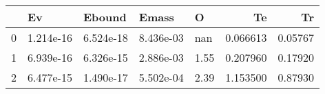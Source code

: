 \begin{tabular}{lllllrr}
\toprule
{} &         Ev &     Ebound &      Emass &     O &        Te &       Tr \\
\midrule
0 &  1.214e-16 &  6.524e-18 &  8.436e-03 &   nan &  0.066613 &  0.05767 \\
1 &  6.939e-16 &  6.326e-15 &  2.886e-03 &  1.55 &  0.207960 &  0.17920 \\
2 &  6.477e-15 &  1.490e-17 &  5.502e-04 &  2.39 &  1.153500 &  0.87930 \\
\bottomrule
\end{tabular}
